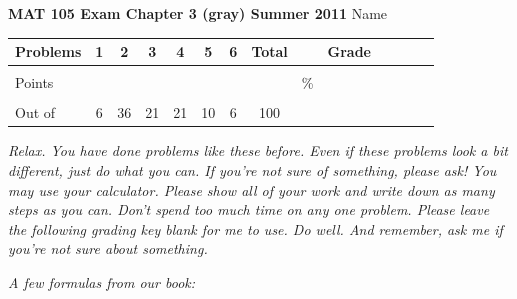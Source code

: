 \documentclass[12pt]{article}
\begin{document}
{\bf MAT 105 Exam Chapter 3 (gray) Summer 2011} \hspace{.4in} {\large Name} \hrulefill

\hrulefill


\begin{center}

\begin{tabular}
{|l|c|c|c|c|c|c|c|c|c|c|c|c|c|} \hline

 Problems & \hspace{5 pt} 1 \hspace{5 pt}  & \hspace{5 pt} 2 \hspace{5 pt} & \hspace{5 pt} 3 \hspace{5 pt} & \hspace{5 pt} 4 \hspace{5 pt} & \hspace{5 pt} 5 \hspace{5 pt} &  \hspace{5 pt} 6 \hspace{5 pt} &  \hspace{5 pt} Total  \hspace{5 pt} & &  \hspace{5 pt} Grade \hspace{5 pt}  \\ \hline
&&&&&&& &&\\  
Points &&&&&&& &    \hspace{.8in}\% &  \\ 
&&&&&& &&& \\  \hline
Out of & 6 & 36  & 21 & 21 & 10 & 6 &100 & & \\ \hline

\end {tabular}
 
\end{center}

 \emph{Relax.  You have done problems like these before.  Even if these problems look a bit different, just do what you can.  If you're not sure of something, please ask! You may use your calculator.  Please show all of your work and write down as many steps as you can.  Don't spend too much time on any one problem.  Please leave the following grading key blank for me to use.  Do well.  And remember, ask me if you're not sure about something.}
 
 \vspace{.1 in}
 
 \emph{A few formulas from our book:}
  \vspace{.2in}
 
\end{document}
